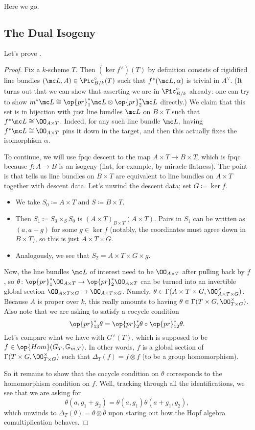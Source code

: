 \documentclass[../notes.tex]{subfiles}
\begin{document}
Here we go.

\subsection{The Dual Isogeny}
Let's prove .
\dualmapthm*
\begin{proof}
	Fix a $k$-scheme $T$. Then $(\ker f^\lor)(T)$ by definition consists of rigidified line bundles $(\mc L,A)\in\Pic_{B/k}^\circ(T)$ such that $f^*(\mc L,\alpha)$ is trivial in $A^\lor$. (It turns out that we can show that asserting we are in $\Pic_{B/k}^\circ$ already: one can try to show $m^*\mc L\cong\op{pr}_1^*\mc L\otimes\op{pr}_2^*\mc L$ directly.) We claim that this set is in bijection with just line bundles $\mc L$ on $B\times T$ such that $f^*\mc L\cong\OO_{A\times T}$. Indeed, for any such line bundle $\mc L$, having $f^*\mc L\cong\OO_{A\times T}$ pins it down in the target, and then this actually fixes the isomorphism $\alpha$.

	To continue, we will use fpqc descent to the map $A\times T\to B\times T$, which is fpqc because $f\colon A\to B$ is an isogeny (flat, for example, by miracle flatness). The point is that  tells us line bundles on $B\times T$ are equivalent to line bundles on $A\times T$ together with descent data. Let's unwind the descent data; set $G\coloneqq\ker f$.
	\begin{itemize}
		\item We take $S_0\coloneqq A\times T$ and $S\coloneqq B\times T$.
		\item Then $S_1\coloneqq S_0\times_SS_0$ is $(A\times T)_{B\times T}(A\times T)$. Pairs in $S_1$ can be written as $(a,a+g)$ for some $g\in\ker f$ (notably, the coordinates must agree down in $B\times T$), so this is just $A\times T\times G$.
		\item Analogously, we see that $S_2=A\times T\times G\times g$.
	\end{itemize}
	Now, the line bundles $\mc L$ of interest need to be $\OO_{A\times T}$ after pulling back by $f$, so $\theta\colon\op{pr}_1^*\OO_{A\times T}\to\op{pr}_2^*\OO_{A\times T}$ can be turned into an invertible global section $\OO_{A\times T\times G}\to\OO_{A\times T\times G}$. Namely, $\theta\in\Gamma(A\times T\times G,\OO_{A\times T\times G}^\times)$. Because $A$ is proper over $k$, this really amounts to having $\theta\in\Gamma(T\times G,\OO_{T\times G}^\times)$. Also note that we are asking to satisfy a cocycle condition
	\[\op{pr}_{13}^*\theta=\op{pr}_2^*\theta\circ\op{pr}_{12}^*\theta.\]
	Let's compare what we have with $G^\lor(T)$, which is supposed to be $f\in\op{Hom}(G_T,\mathbb G_{m,T})$. In other words, $f$ is a global section of $\Gamma(T\times G,\OO_{T\times G}^\times)$ such that $\Delta_T(f)=f\otimes f$ (to be a group homomorphism).

	So it remains to show that the cocycle condition on $\theta$ corresponds to the homomorphism condition on $f$. Well, tracking through all the identifications, we see that we are asking for
	\[\theta(a,g_1+g_2)=\theta(a,g_1)\theta(a+g_1,g_2),\]
	which unwinds to $\Delta_T(\theta)=\theta\otimes\theta$ upon staring out how the Hopf algebra comultiplication behaves.
\end{proof}
\end{document}
